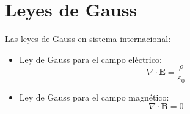 \documentclass{article}
\begin{document}
   \section*{Leyes de Gauss}
   
   Las leyes de Gauss en sistema internacional:
   
   \begin{itemize}
   \item Ley de Gauss para el campo eléctrico:
   \begin{equation}
   \nabla \cdot \mathbf{E} = \frac{\rho}{\varepsilon_0}
   \end{equation}
   \item Ley de Gauss para el campo magnético:
   \begin{equation}
   \nabla \cdot \mathbf{B} = 0
   \end{equation}
   \end{itemize} 
   
\end{document}
